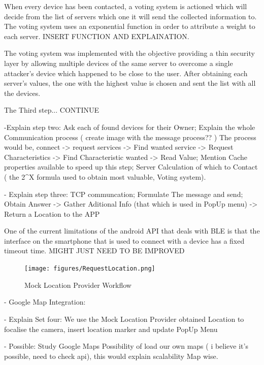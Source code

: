 \documentclass[a4paper]{IEEEtran}
\begin{document}
When every device has been contacted, a voting system is actioned which will decide from the list of servers which one it will send the collected information to. The voting system uses an exponential function in order to attribute a weight to each server. INSERT FUNCTION AND EXPLAINATION.

The voting system was implemented with the objective providing a thin security layer by allowing multiple devices of the same server to overcome a single attacker's device which happened to be close to the user. After obtaining each server's values, the one with the highest value is chosen and sent the list with all the devices. 

The Third step... CONTINUE

-Explain step two: Ask each of found devices for their Owner; Explain the whole Communication process ( create image with the message process?? ) The process would be, connect -> request services -> Find wanted service -> Request Characteristics -> Find Characteristic wanted -> Read Value; Mention Cache properties available to speed up this step; Server Calculation of which to Contact ( the 2^X formula used to obtain most valuable, Voting system).

- Explain step three:  TCP communcation; Formulate The message and send; Obtain Answer -> Gather Aditional Info (that which is used in PopUp menu) -> Return a Location to the APP



One of the current limitations of the android API that deals with BLE is that the interface on the smartphone that is used to connect with a device has a fixed timeout time.  MIGHT JUST NEED TO BE IMPROVED


\begin{figure}
	\centering
		\texttt{[image: figures/RequestLocation.png]}
	\caption[Mock Location Provider Workflow]{Mock Location Provider Workflow}
	\label{fig:MockProvider}
\end{figure}



- Google Map Integration:

- Explain Set four: We use the Mock Location Provider obtained Location to focalise the camera, insert location marker and update PopUp Menu

- Possible: Study Google Maps Possibility of load our own maps ( i believe it's possible, need to check api), this would explain scalability Map wise.
\end{document}
